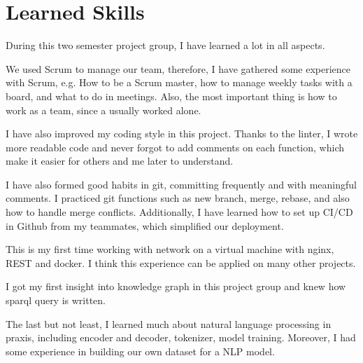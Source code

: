 
\section{Learned Skills}

During this two semester project group,
I have learned a lot in all aspects. 

We used Scrum to manage our team,
therefore, I have gathered some experience with Scrum, 
e.g. How to be a Scrum master, 
how to manage weekly tasks with a board, 
and what to do in meetings. 
Also, the most important thing is how to work as a team, 
since a usually worked alone. 

I have also improved my coding style in this project. 
Thanks to the linter, 
I wrote more readable code and never forgot to add comments on each function, 
which make it easier for others and me later to understand.

I have also formed good habits in git, 
committing frequently and with meaningful comments. 
I practiced git functions such as new branch, merge, rebase, 
and also how to handle merge conflicts. 
Additionally, I have learned how to set up CI/CD in Github from my teammates, 
which simplified our deployment.

This is my first time working with network on a virtual machine
with nginx, REST and docker. 
I think this experience can be applied on many other projects. 

I got my first insight into knowledge graph in this project group
and knew how sparql query is written. 

The last but not least,
I learned much about natural language processing in praxis, 
including encoder and decoder, tokenizer, model training. 
Moreover, I had some experience in building our own dataset for a NLP model. 